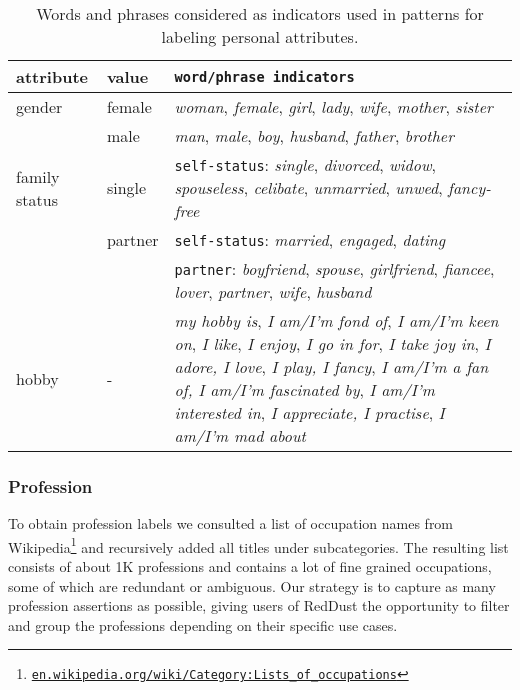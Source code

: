 \begin{table*}
\centering
\begin{adjustbox}{width=0.88\textwidth}
\begin{tabularx}{\linewidth}{llX}
\toprule
\textbf{attribute} & \textbf{value} & \texttt{\footnotesize word/phrase indicators} \\
\midrule
gender & female & \textit{woman}, \textit{female}, \textit{girl}, \textit{lady}, \textit{wife}, \textit{mother}, \textit{sister} \\
 & male & \textit{man}, \textit{male}, \textit{boy}, \textit{husband}, \textit{father}, \textit{brother}
 \\ [1.0ex]
family status & single & \texttt{\footnotesize self-status}: \textit{single}, \textit{divorced}, \textit{widow}, \textit{spouseless}, \textit{celibate}, \textit{unmarried},  \textit{unwed},  \textit{fancy-free} \\
 & partner & \texttt{\footnotesize self-status}: \textit{married}, \textit{engaged}, \textit{dating} \\
 & & \texttt{\footnotesize partner}: \textit{boyfriend}, \textit{spouse}, \textit{girlfriend}, \textit{fiancee}, \textit{lover}, \textit{partner}, \textit{wife}, \textit{husband}
  \\ [1.0ex]
hobby & - & \textit{my hobby is}, \textit{I am/I'm fond of}, \textit{I am/I'm keen on}, \textit{I like}, \textit{I enjoy}, \textit{I go in for}, \textit{I take joy in}, \textit{I adore,} \textit{I love}, \textit{I play, I fancy}, \textit{I am/I'm a fan of, I am/I'm fascinated by}, \textit{I am/I'm interested in}, \textit{I appreciate, I practise}, \textit{I am/I'm mad about} \\
\bottomrule
\end{tabularx}
\end{adjustbox}
\caption{Words and phrases considered as indicators used in patterns for labeling personal attributes.}
\label{word_table}
\end{table*}

\subsubsection{Profession}
To obtain profession labels we consulted a list of occupation names from Wikipedia\footnote{{\scriptsize \href{https://en.wikipedia.org/wiki/Category:Lists_of_occupations}{\texttt{en.wikipedia.org/wiki/Category:Lists\_of\_occupations}}}} and recursively added all titles under subcategories. The resulting list consists of about 1K professions and contains a lot of fine grained occupations, some of which are redundant or ambiguous. Our strategy is to capture as many profession assertions as possible, giving users of RedDust the opportunity to filter and group the professions depending on their specific use cases.

